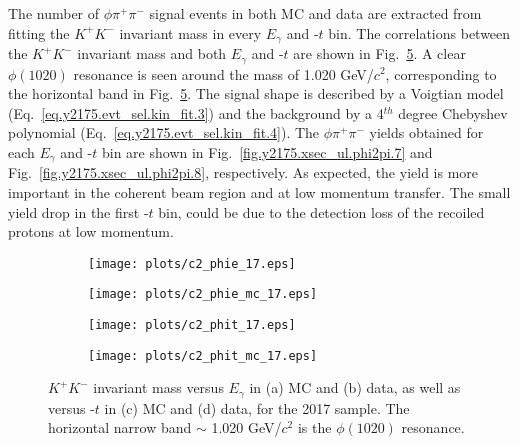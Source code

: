 The number of $\phi \pi^{+} \pi^{-}$ signal events in both MC and data are extracted from fitting the $K^+K^-$ invariant mass in every $E_{\gamma}$ and -$t$ bin. The correlations between the $K^+K^-$ invariant mass and both $E_{\gamma}$ and -$t$ are shown in Fig.~\ref{fig.y2175.xsec_ul.phi2pi.2}. A clear $\phi(1020)$ resonance is seen around the mass of 1.020 GeV/$c^2$, corresponding to the horizontal band in Fig.~\ref{fig.y2175.xsec_ul.phi2pi.2}. The signal shape is described by a Voigtian model (Eq.~\ref{eq.y2175.evt_sel.kin_fit.3}) and the background by a 4$^{th}$ degree Chebyshev polynomial (Eq.~\ref{eq.y2175.evt_sel.kin_fit.4}). The $\phi \pi^{+} \pi^{-}$ yields obtained for each $E_{\gamma}$ and -$t$ bin are shown in Fig.~\ref{fig.y2175.xsec_ul.phi2pi.7} and Fig.~\ref{fig.y2175.xsec_ul.phi2pi.8}, respectively. As expected, the yield is more important in the coherent beam region and at low momentum transfer. The small yield drop in the first -$t$ bin, could be due to the detection loss of the recoiled protons at low momentum. 

\begin{center}
\null
\vfill
\begin{figure}[htbp]
    \centering
    \begin{subfigure}[b]{0.5\textwidth}
        \texttt{[image: plots/c2\_phie\_17.eps]}
        \caption{}
        \label{fig.y2175.xsec_ul.phi2pi.2.a}
    \end{subfigure}\hfill
    \begin{subfigure}[b]{0.5\textwidth}
        \texttt{[image: plots/c2\_phie\_mc\_17.eps]}
        \caption{}
        \label{fig.y2175.xsec_ul.phi2pi.2.b}
    \end{subfigure}
    \begin{subfigure}[b]{0.5\textwidth}
        \texttt{[image: plots/c2\_phit\_17.eps]}
        \caption{}
        \label{fig.y2175.xsec_ul.phi2pi.2.c}
    \end{subfigure}\hfill
    \begin{subfigure}[b]{0.5\textwidth}
        \texttt{[image: plots/c2\_phit\_mc\_17.eps]}
        \caption{}
        \label{fig.y2175.xsec_ul.phi2pi.2.d}
    \end{subfigure}
    \caption{\label{fig.y2175.xsec_ul.phi2pi.2}$K^{+}K^{-}$ invariant mass versus $E_{\gamma}$ in (a) MC and (b) data, as well as versus -$t$ in (c) MC and (d) data, for the 2017 sample. The horizontal narrow band $\sim$ 1.020 GeV/$c^2$ is the $\phi(1020)$ resonance.}
\end{figure}
\null
\vfill
\end{center}

